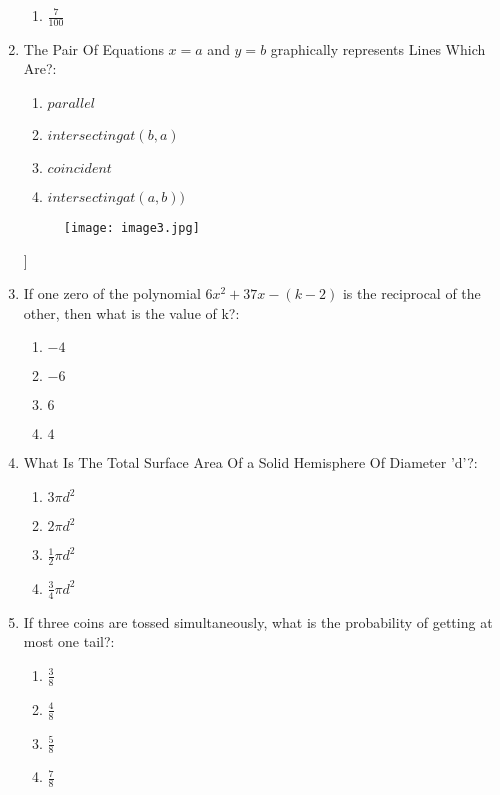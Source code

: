 \documentclass[12pt-letter paper]{article}
\providecommand{\brak}[1]{\ensuremath{\left(#1\right)}}
\begin{document}
\begin{enumerate}
\begin{enumerate}
\item $ \frac{7}{100} $
\end{enumerate}
\item The Pair Of Equations $x=a$ and $y=b$ graphically represents Lines Which Are?:    
\begin{enumerate}
\item $ parallel $                                  
\item $ intersecting at \brak{b,a} $                                
\item $ coincident $    
\item $ intersecting at \brak{a,b}) $
\end{enumerate}
\begin{figure}[h!]    
\centering                                            
\texttt{[image: image3.jpg]}    
\label{fig:image3}        
\end{figure}]
\item If one zero of the polynomial $6x^2 + 37x - \brak{k-2}$ is the reciprocal of the other,
then what is the value of k?:      
\begin{enumerate}
\item $ -4 $          
\item $ -6 $
\item $ 6 $                                          
\item $ 4 $
\end{enumerate}
\item What Is The Total Surface Area Of a Solid Hemisphere Of Diameter 'd'?:    \begin{enumerate}                          
\item $ 3\pi d^2 $                        
\item $ 2\pi d^2 $                                    
\item $ \frac{1}{2}\pi d^2 $
\item $ \frac{3}{4}\pi d^2 $
\end{enumerate}
\item If three coins are tossed simultaneously, what is the probability of getting at most one tail?:
\begin{enumerate}
\item $ \frac{3}{8} $                              
\item $ \frac{4}{8} $                            
\item $ \frac{5}{8} $  
\item $ \frac{7}{8} $    
\end{enumerate}

\end{enumerate}
\end{document}

